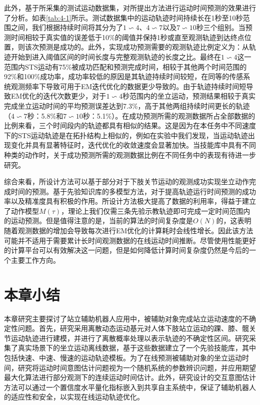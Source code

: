 此外，基于所采集的测试运动数据集，对所提出方法进行运动时间预测的效果进行了分析。如表\ref{tab:4-1}所示。测试数据集中的运动轨迹时间持续长在1秒至10秒范围之间，我们根据持续时间将其分为了$1\backsim 4$、$4\backsim 7$以及$7\backsim 10$秒三个组别。当预测时间相较于真实值的误差低于10\%的阈值并保持1秒或直至观测轨迹到达终点位置，则该次预测是成功的。此外，实现成功预测需要的观测轨迹比例定义为：从轨迹开始到进入阈值区间的时间长度与完整观测轨迹的长度之比。最终在$1\backsim 4$这一范围内STS运动有75\%被成功匹配和预测完成时间，相较于其他两个时间范围的92\%和100\%成功率，成功率较低的原因是其轨迹持续时间较短，在同等的传感系统观测频率下导致可用于EM迭代优化的数据更少导致的。由于轨迹持续时间短导致EM优化的迭代次数更少，对于$1\backsim 4$秒范围内的坐立运动，预测结果相较于真实完成坐立运动时间的平均预测误差达到7.3\%，高于其他两组持续时间更长的轨迹（$4\backsim 7$秒：5.8\%和$7\backsim 10$秒：5.1\%）。在成功预测所需的观测数据所占全部数据的比例来看，三个时间段内的轨迹都具有相似的结果。这是因为在本任务中不同速度下的STS运动轨迹是在拓扑结构上相似的，例如在实验中我们发现，当运动轨迹出现变化并具有显著特征时，迭代优化的收敛速度会显著加快。当技能库中具有不同种类的动作时，关于成功预测所需的观测数据比例在不同任务中的表现有待进一步研究。

综合来看，所设计方法可以基于部分对于下肢关节运动的观测成功实现坐立动作完成时间的预测。基于先验知识库的多模型方法，对于提高轨迹运行时间预测的成功率以及精准度具有积极的作用。所设计方法极大提高了数据的利用率，得益于建立了动作模型$M(\tau)$，理论上我们仅需三条先验示教轨迹即可完成一定时间范围内的运动预测。但是值得注意的是，当前的算法的时间复杂度是$O(N)$的，这表明随着观测数据的增加会导致每次进行EM优化的计算耗时会线性增长。因此该方法可能并不适用于需要累计长时间观测数据的在线运动时间推断。尽管使用性能更好的计算平台可以有效解决这一问题，但是如何降低计算时间复杂度仍然是今后的一个主要工作方向。

\section{本章小结}
本章研究主要探讨了站立辅助机器人应用中，被辅助对象完成站立运动速度的不确定性问题。首先，研究采用离散动态运动基元对人体下肢站立运动的踝、膝、髋关节运动轨迹进行建模，并进行了离散概率处理以表示轨迹的不确定性区间。研究采集了真实场景下的坐立运动离线数据，基于这些数据建立了一个先验技能库，其中包括快速、中速、慢速的运动轨迹模板。为了在线预测被辅助对象的坐立运动时间，研究将运动时间意图估计问题视为一个随机系统的参数辨识问题，并应用期望最大化算法进行部分观测下的连续运动时间估计。此外，研究设计的交互意图估计方法可以通过一个置信度水平量化指标嵌入到共享自主系统中，保证了辅助机器人的适应性和安全，以实现在线运动轨迹优化。
